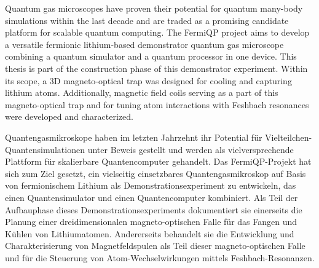 Quantum gas microscopes have proven their potential for quantum many-body simulations within the last decade and are traded as a promising candidate platform for scalable quantum computing. The FermiQP project aims to develop a versatile fermionic lithium-based demonstrator quantum gas microscope combining a quantum simulator and a quantum processor in one device. This thesis is part of the construction phase of this demonstrator experiment. Within its scope, a 3D magneto-optical trap was designed for cooling and capturing lithium atoms. Additionally, magnetic field coils serving as a part of this magneto-optical trap and for tuning atom interactions with Feshbach resonances were developed and characterized.
\vspace{2cm}

Quantengasmikroskope haben im letzten Jahrzehnt ihr Potential für Vielteilchen-Quantensimulationen unter Beweis gestellt und werden als vielversprechende Plattform für skalierbare Quantencomputer gehandelt. Das FermiQP-Projekt hat sich zum Ziel gesetzt, ein vielseitig einsetzbares Quantengasmikroskop auf Basis von fermionischem Lithium als Demonstrationsexperiment zu entwickeln, das einen Quantensimulator und einen Quantencomputer kombiniert. Als Teil der Aufbauphase dieses Demonstrationsexperiments dokumentiert sie einerseits die Planung einer dreidimensionalen magneto-optischen Falle für das Fangen und Kühlen von Lithiumatomen. Andererseits behandelt sie die Entwicklung und Charakterisierung von Magnetfeldspulen als Teil dieser magneto-optischen Falle und für die Steuerung von Atom-Wechselwirkungen mittels Feshbach-Resonanzen.